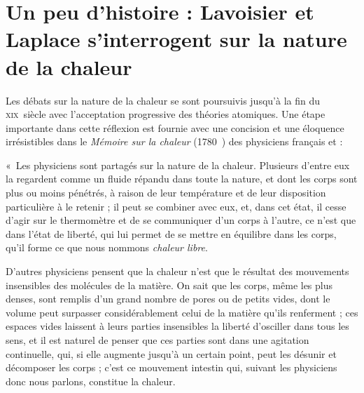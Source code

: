 \atstartofhistorysection
\section[Un peu d’histoire : les questionnements de Lavoisier et Laplace]{Un peu d’histoire :\onlyamphibook{\\} Lavoisier et Laplace s'interrogent sur la nature de la chaleur}
\label{ch_histoire_lavoisier_laplace_depondt}


	Les débats sur la nature de la chaleur se sont poursuivis jusqu'à la fin du \textsc{xix}\ieme\ siècle avec l'acceptation progressive des théories atomiques. Une étape importante dans cette réflexion est fournie avec une concision et une éloquence irrésistibles dans le \textit{Mémoire sur la chaleur} (1780~\cite{lavoisierlaplace1780}) des physiciens français  et  :

	\onlyframabook{\begin{quote}}
	\onlyamphibook{\begin{historyquote}} «~Les physiciens sont partagés sur la nature de la chaleur. Plusieurs d’entre eux la regardent comme un fluide répandu dans toute la nature, et dont les corps sont plus ou moins pénétrés, à raison de leur température et de leur disposition particulière à le retenir ; il peut se combiner avec eux, et, dans cet état, il cesse d’agir sur le thermomètre et de se communiquer d’un corps à l’autre, ce n’est que dans l’état de liberté, qui lui permet de se mettre en équilibre dans les corps, qu’il forme ce que nous nommons \textit{chaleur libre}.

	D’autres physiciens pensent que la chaleur n’est que le résultat des mouvements insensibles des molécules de la matière. On sait que les corps, même les plus denses, sont remplis d’un grand nombre de pores ou de petits vides, dont le volume peut surpasser considérablement celui de la matière qu’ils renferment ; ces espaces vides laissent à leurs parties insensibles la liberté d’osciller dans tous les sens, et il est naturel de penser que ces parties sont dans une agitation continuelle, qui, si elle augmente jusqu’à un certain point, peut les désunir et décomposer les corps ; c’est ce mouvement intestin qui, suivant les physiciens donc nous parlons, constitue la chaleur.


